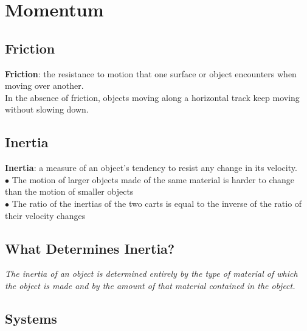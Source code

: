 \section{Momentum}

    \subsection{Friction}

        \textbf{Friction}: the resistance to motion that one surface or object encounters when moving over another. \\
        In the absence of friction, objects moving along a horizontal track keep moving without slowing down.


    \subsection{Inertia}

        \textbf{Inertia}: a measure of an object's tendency to resist any change in its velocity. \\
        $\bullet$ The motion of larger objects made of the same material is harder to change than the motion of smaller objects \\
        $\bullet$ The ratio of the inertias of the two carts is equal to the inverse of the ratio of their velocity changes

    \subsection{What Determines Inertia?}

        \textit{The inertia of an object is determined entirely by the type of material of which the object is made and by the amount of that material contained in the object.}


    \subsection{Systems}

